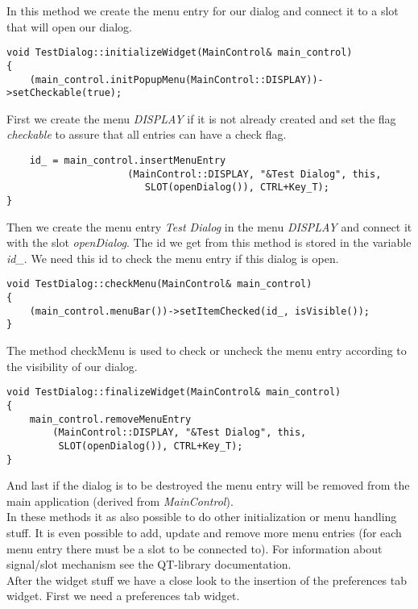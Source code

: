In this method we create the menu entry for our dialog and connect it to a slot
that will open our dialog.

\begin{verbatim}
void TestDialog::initializeWidget(MainControl& main_control)
{
	(main_control.initPopupMenu(MainControl::DISPLAY))->setCheckable(true);
\end{verbatim}

First we create the menu {\em DISPLAY} if it is not already created and set
the flag {\em checkable} to assure that all entries can have a check flag.

\begin{verbatim}
	id_ = main_control.insertMenuEntry
					 (MainControl::DISPLAY, "&Test Dialog", this,
						SLOT(openDialog()), CTRL+Key_T);   
}
\end{verbatim}

Then we create the menu entry {\em Test Dialog} in the menu {\em DISPLAY}
and connect it with the slot {\em openDialog}. The id we get from this method is
stored in the variable {\em id\_}. We need this id to check the menu entry if
this dialog is open.

\begin{verbatim}
void TestDialog::checkMenu(MainControl& main_control)
{
	(main_control.menuBar())->setItemChecked(id_, isVisible());
}
\end{verbatim}

The method checkMenu is used to check or uncheck the menu entry according to the
visibility of our dialog.

\begin{verbatim}
void TestDialog::finalizeWidget(MainControl& main_control)
{
	main_control.removeMenuEntry
		(MainControl::DISPLAY, "&Test Dialog", this,
		 SLOT(openDialog()), CTRL+Key_T);   
}
\end{verbatim}

And last if the dialog is to be destroyed the menu entry will be removed from
the main application (derived from {\em MainControl}).\\

In these methods it as also possible to do other initialization or menu handling stuff.
It is even possible to add, update and remove more menu entries (for each menu entry
there must be a slot to be connected to).
For information about signal/slot mechanism see the QT-library documentation.\\

After the widget stuff we have a close look to the insertion of the preferences tab widget.
First we need a preferences tab widget.

